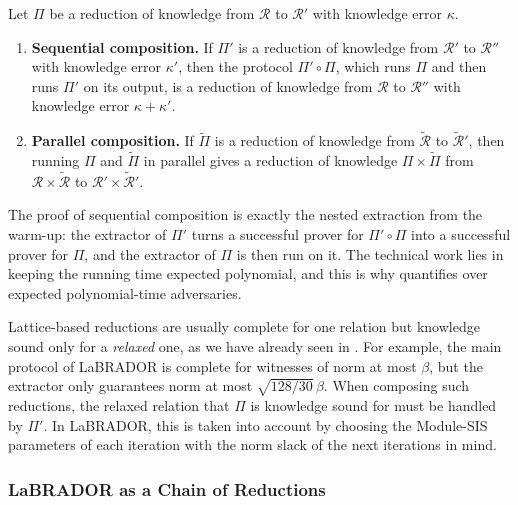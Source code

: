 \documentclass[../../book.tex]{subfiles}
\begin{document}
\begin{theorem}\label{thm:rok-composition}
    Let $\Pi$ be a reduction of knowledge from $\mathcal{R}$ to $\mathcal{R}'$ with knowledge error $\kappa$.
    \begin{enumerate}
        \item[\textit{(i)}] \textbf{Sequential composition.} If $\Pi'$ is a reduction of knowledge from $\mathcal{R}'$ to $\mathcal{R}''$ with knowledge error $\kappa'$, then the protocol $\Pi' \circ \Pi$, which runs $\Pi$ and then runs $\Pi'$ on its output, is a reduction of knowledge from $\mathcal{R}$ to $\mathcal{R}''$ with knowledge error $\kappa + \kappa'$.
        \item[\textit{(ii)}] \textbf{Parallel composition.} If $\widetilde{\Pi}$ is a reduction of knowledge from $\widetilde{\mathcal{R}}$ to $\widetilde{\mathcal{R}}'$, then running $\Pi$ and $\widetilde{\Pi}$ in parallel gives a reduction of knowledge $\Pi \times \widetilde{\Pi}$ from $\mathcal{R} \times \widetilde{\mathcal{R}}$ to $\mathcal{R}' \times \widetilde{\mathcal{R}}'$.
    \end{enumerate}
\end{theorem}

The proof of sequential composition is exactly the nested extraction from the warm-up: the extractor of $\Pi'$ turns a successful prover for $\Pi' \circ \Pi$ into a successful prover for $\Pi$, and the extractor of $\Pi$ is then run on it.
The technical work lies in keeping the running time expected polynomial, and this is why  quantifies over expected polynomial-time adversaries.

\begin{remark}\label{remark:rok-relaxed}
    Lattice-based reductions are usually complete for one relation but knowledge sound only for a \emph{relaxed} one, as we have already seen in .
    For example, the main protocol of LaBRADOR is complete for witnesses of norm at most $\beta$, but the extractor only guarantees norm at most $\sqrt{128/30}\,\beta$.
    When composing such reductions, the relaxed relation that $\Pi$ is knowledge sound for must be handled by $\Pi'$.
    In LaBRADOR, this is taken into account by choosing the Module-SIS parameters of each iteration with the norm slack of the next iterations in mind.
\end{remark}

\subsubsection{LaBRADOR as a Chain of Reductions}
\end{document}
